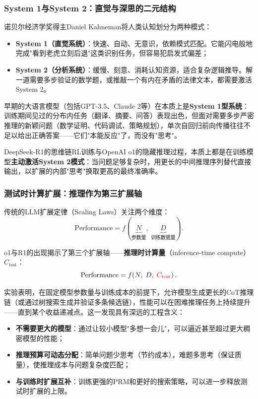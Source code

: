 \documentclass[12pt,a4paper]{article}
\begin{document}
\subsubsection{System 1与System 2：直觉与深思的二元结构}

诺贝尔经济学奖得主Daniel Kahneman将人类认知划分为两种模式：
\begin{itemize}
    \item \textbf{System 1（直觉系统）}：快速、自动、无意识，依赖模式匹配。它能闪电般地完成"看到老虎立刻后退"这类识别任务，但容易犯启发式偏差；
    \item \textbf{System 2（分析系统）}：缓慢、刻意、消耗认知资源，适合复杂逻辑推导。解一道需要多步验证的数学题，或推敲一个有内在矛盾的法律文本，都需要激活System 2。
\end{itemize}

早期的大语言模型（包括GPT-3.5、Claude 2等）在本质上是\textbf{System 1型系统}：训练期间见过的分布内任务（翻译、摘要、问答）表现出色，但面对需要多步严密推理的新颖问题（数学证明、代码调试、策略规划），单次自回归前向传播往往不足以给出正确答案——它们"本能反应"了，而没有"思考"。

DeepSeek-R1的思维链RL训练与OpenAI o1的隐藏推理过程，本质上都是在训练模型\textbf{主动激活System 2模式}：当问题足够复杂时，用更长的中间推理序列替代直接输出，以扩展的内部"思考"换取更高的最终准确率。

\subsubsection{测试时计算扩展：推理作为第三扩展轴}

传统的LLM扩展定律（Scaling Laws）关注两个维度：
\begin{equation}
\text{Performance} = f\!\left(\underbrace{N}_{\text{参数量}},\; \underbrace{D}_{\text{训练数据量}}\right).
\end{equation}

o1与R1的出现揭示了第三个扩展轴——\textbf{推理时计算量}（inference-time compute）$C_{\text{test}}$：
\begin{equation}
\text{Performance} = f\!\left(N,\; D,\; \textcolor{red}{C_{\text{test}}}\right).
\end{equation}

实验表明，在固定模型参数量与训练成本的前提下，允许模型生成更长的CoT推理链（或通过树搜索生成并验证多条候选链），性能可以在困难推理任务上持续提升——直到某个收益递减点。这一发现具有深远的工程含义：
\begin{itemize}
    \item \textbf{不需要更大的模型}：通过让较小模型"多想一会儿"，可以逼近甚至超过更大稠密模型的性能；
    \item \textbf{推理预算可动态分配}：简单问题少思考（节约成本），难题多思考（保证质量），使推理成本与问题复杂度匹配；
    \item \textbf{与训练时扩展互补}：训练更强的PRM和更好的搜索策略，可以进一步释放测试时扩展的上限。
\end{itemize}
\end{document}
